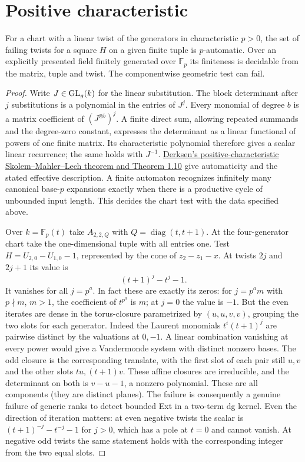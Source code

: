\documentclass[11pt]{article}
\begin{document}
\section{Positive characteristic}
\begin{prop}\label{positive}
For a chart with a linear twist of the generators in characteristic
$p>0$, the set of failing twists for a square $H$ on a given finite
tuple is $p$-automatic. Over an explicitly presented field finitely
generated over $\mathbb F_p$ its finiteness is decidable from the
matrix, tuple and twist. The componentwise geometric test can fail.
\end{prop}
\begin{proof}
Write $J\in{\rm GL}_g(k)$ for the linear substitution. The block
determinant after $j$ substitutions is a polynomial in the entries
of $J^j$. Every monomial of degree $b$ is a matrix coefficient
of $(J^{\otimes b})^j$. A finite direct sum, allowing repeated summands
and the degree-zero constant, expresses the determinant as a linear
functional of powers of one finite matrix. Its characteristic polynomial
therefore gives a scalar linear recurrence; the same holds with
$J^{-1}$. \href{https://arxiv.org/abs/math/0510583}{Derksen's
positive-characteristic Skolem--Mahler--Lech theorem and Theorem 1.10}
give automaticity and the stated effective description. A finite
automaton recognizes infinitely many canonical base-$p$ expansions
exactly when there is a productive cycle of unbounded input length.
This decides the chart test with the data specified above.

Over $k=\mathbb F_p(t)$ take $A_{2,2,Q}$ with
$Q=\operatorname{diag}(t,t+1)$. At the four-generator chart take
the one-dimensional tuple with all entries one. Test
$H=U_{2,0}-U_{1,0}-1$, represented by the cone of $z_2-z_1-x$.
At twists $2j$ and $2j+1$ its value is
\[
                      (t+1)^j-t^j-1 .
\]
It vanishes for all $j=p^a$. In fact these are exactly its zeros:
for $j=p^a m$ with $p\nmid m$, $m>1$, the coefficient of
$t^{p^a}$ is $m$; at $j=0$ the value is $-1$.
But the even iterates are dense in the torus-closure parametrized
by $(u,u,v,v)$, grouping the two slots for each generator. Indeed
the Laurent monomials $t^i(t+1)^j$ are pairwise distinct by the
valuations at $0,-1$. A linear combination vanishing at every power
would give a Vandermonde system with distinct nonzero bases.
The odd closure is the corresponding translate, with the first slot of
each pair still $u,v$ and the other slots $tu,(t+1)v$.
These affine closures are irreducible, and the determinant on both
is $v-u-1$, a nonzero polynomial. These are all components (they
are distinct planes). The failure is consequently a genuine failure
of generic ranks to detect bounded Ext in a two-term dg kernel.
Even the direction of iteration matters: at even negative twists the
scalar is $(t+1)^{-j}-t^{-j}-1$ for $j>0$, which has a pole at
$t=0$ and cannot vanish. At negative odd twists the same statement
holds with the corresponding integer from the two equal slots.
\end{proof}
\end{document}
